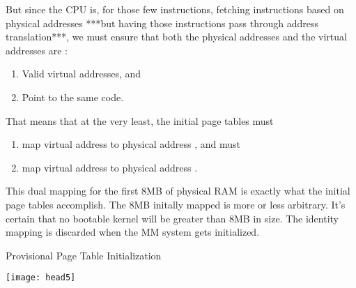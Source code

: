 \begin{description}
  But since the CPU is, for those few instructions, fetching instructions based on
  physical addresses ***but having those instructions pass through address translation***,
  we must ensure that both the physical addresses and the virtual addresses are :
  \begin{enumerate}
  \item Valid virtual addresses, and
  \item Point to the same code.
  \end{enumerate}
  That means that at the very least, the initial page tables must
  \begin{enumerate}
  \item map virtual address  to physical address ,
    and must
  \item map virtual address  to physical address .
  \end{enumerate}
  This dual mapping for the first 8MB of physical RAM is exactly what the initial page
  tables accomplish. The 8MB initally mapped is more or less arbitrary. It's certain that
  no bootable kernel will be greater than 8MB in size. The identity mapping is discarded
  when the MM system gets initialized.
\end{description}

\begin{frame}{Provisional Page Table Initialization}
  \begin{block}{}
    \begin{center}
      \texttt{[image: head5]}
    \end{center}
  \end{block}
\end{frame}

